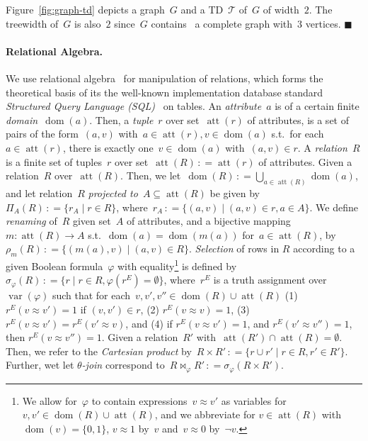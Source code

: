 \documentclass{llncs}
\newcommand{\eqdef}{\ensuremath{\,\mathrel{\mathop:}=}}
\newcommand{\TTT}{\mathcal{T}}
\DeclareMathOperator{\dom}{dom}
\DeclareMathOperator{\attr}{att}
\DeclareMathOperator{\var}{var}
\renewenvironment{example}{\begin{EXa}}{\hfill\ensuremath{\blacksquare}\end{EXa}}
\begin{document}
\begin{example}
Figure~\ref{fig:graph-td} depicts a graph~$G$
and a TD~$\TTT$ of~$G$ of width~$2$.
  The treewidth of~$G$ is also~$2$ since~$G$ contains~\cite{Kloks94a} a complete graph with~$3$ vertices.
\end{example}
%
%
%
%
%

\paragraph*{Relational Algebra.}%
We use relational algebra~\cite{Codd70} for manipulation of relations,
which forms the theoretical basis of its the well-known implementation database standard 
\emph{Structured Query Language (SQL)}~\cite{} on tables.
An \emph{attribute}~$a$ is of a certain finite \emph{domain~$\dom(a)$}.
Then, a \emph{tuple}~$r$ over set~$\attr(r)$ of attributes,
is a set of pairs of the form~$(a, v)$ with~$a\in\attr(r),v\in \dom(a)$ s.t.\ for each~$a\in \attr(r)$, there is exactly one~$v\in\dom(a)$ with~$(a,v)\in r$.
A \emph{relation~$R$} is a finite set of tuples~$r$ over set~$\attr(R)\eqdef\attr(r)$ of attributes.
Given a relation~$R$ over~$\attr(R)$.
Then, we let~$\dom(R)\eqdef \bigcup_{a\in \attr(R)}\dom(a)$, and let relation~$R$ \emph{projected to~$A\subseteq \attr(R)$} be given by $\Pi_{A}(R)\eqdef \{r_A \mid r\in R\}$, where~$r_A \eqdef \{(a, v) \mid (a, v) \in r, a \in A\}$.
We define \emph{renaming} of~$R$ given set~$A$ of attributes, and a bijective mapping~$m:\attr(R) \rightarrow A$ s.t.\ $\dom(a)=\dom(m(a))$ for~$a\in\attr(R)$, by~$\rho_m(R) \eqdef \{(m(a),v) \mid (a,v)\in R\}$.
\emph{Selection} of rows in $R$ according to a given Boolean formula~$\varphi$ with equality\footnote{We allow for~$\varphi$ to contain expressions~$v{\approx}v'$ as variables for $v,v'\in\dom(R)\cup\attr(R)$, and we abbreviate for $v\in\attr(R)$ with~$\dom(v)=\{0,1\}$, $v{\approx}1$ by~$v$ and~$v{\approx}0$ by~$\neg v$.} is defined by~$\sigma_{\varphi}(R)\eqdef \{ r \mid r\in R, \varphi(r^E)=\emptyset \}$, where~$r^{E}$ is a truth assignment over~$\var(\varphi)$ such that for each~$v,v',v''\in\dom(R)\cup\attr(R)$ (1) $r^E(v{\approx}v')=1$ if $(v, v')\in r$, (2) $r^E(v{\approx}v)=1$, (3) $r^E(v{\approx}v')=r^E(v'{\approx}v)$, and (4) if $r^E(v{\approx}v')=1$, and $r^E(v'{\approx}v'')=1$, then $r^E(v{\approx}v'')=1$.
Given a relation~$R'$ with~$\attr(R')\cap\attr(R)=\emptyset$. Then, we refer to the \emph{Cartesian product} by~$R\times R'\eqdef \{ r\cup r' \mid r\in R, r'\in R'\}$.
Further, wet let \emph{$\theta$-join} correspond to~$R \bowtie_\varphi R' \eqdef \sigma_\varphi(R\times R')$.
\end{document}
